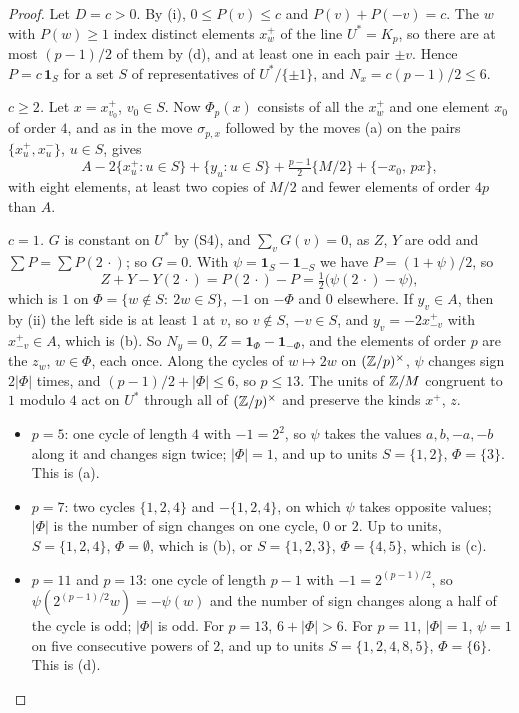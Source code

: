 \begin{proof}
Let $D=c>0$. By (i), $0\le P(v)\le c$ and
$P(v)+P(-v)=c$. The $w$ with $P(w)\ge1$ index distinct elements $x^{+}_{w}$ of
the line $U^{*}=K_{p}$, so there are at most $(p-1)/2$ of them by
(d), and at least one in each pair $\pm v$. Hence
$P=c\,\mathbf 1_{S}$ for a set $S$ of representatives of $U^{*}/\{\pm1\}$, and
$N_{x}=c(p-1)/2\le6$.

\emph{$c\ge2$.} Let $x=x^{+}_{v_{0}}$, $v_{0}\in S$. Now $\Phi_{p}(x)$ consists of
all the $x^{+}_{w}$ and one element $x_{0}$ of order $4$, and as in
 the move $\sigma_{p,x}$ followed by the moves
(a) on the pairs $\{x^{+}_{u},x^{-}_{u}\}$, $u\in S$, gives
\[
  A-2\{x^{+}_{u}:u\in S\}+\{y_{u}:u\in S\}+\tfrac{p-1}{2}\{M/2\}
  +\{-x_{0},\,px\},
\]
with eight elements, at least two copies of $M/2$ and fewer elements of order
$4p$ than $A$.

\emph{$c=1$.} $G$ is constant on $U^{*}$ by (S4), and $\sum_{v}G(v)=0$, as
$Z$, $Y$ are odd and $\sum P=\sum P(2\,\cdot)$; so $G=0$. With
$\psi=\mathbf 1_{S}-\mathbf 1_{-S}$ we have $P=(1+\psi)/2$, so
\[
  Z+Y-Y(2\,\cdot)=P(2\,\cdot)-P=\tfrac12\bigl(\psi(2\,\cdot)-\psi\bigr),
\]
which is $1$ on $\Phi=\{w\notin S:\ 2w\in S\}$, $-1$ on $-\Phi$ and $0$
elsewhere. If $y_{v}\in A$, then by (ii) the left side is
at least $1$ at $v$, so $v\notin S$, $-v\in S$, and $y_{v}=-2x^{+}_{-v}$ with
$x^{+}_{-v}\in A$, which is (b). So $N_{y}=0$,
$Z=\mathbf 1_{\Phi}-\mathbf 1_{-\Phi}$, and the elements of order $p$ are the
$z_{w}$, $w\in\Phi$, each once. Along the cycles of $w\mapsto2w$ on
$(\mathbb{Z}/p)^{\times}$, $\psi$ changes sign $2|\Phi|$ times, and $(p-1)/2+|\Phi|
\le6$, so $p\le13$. The units of $\mathbb{Z}/M$ congruent to $1$ modulo $4$ act on
$U^{*}$ through all of $(\mathbb{Z}/p)^{\times}$ and preserve the kinds $x^{+}$,
$z$.
\begin{itemize}
\item $p=5$: one cycle of length $4$ with $-1=2^{2}$, so $\psi$ takes the
values $a,b,-a,-b$ along it and changes sign twice; $|\Phi|=1$, and up to
units $S=\{1,2\}$, $\Phi=\{3\}$. This is (a).
\item $p=7$: two cycles $\{1,2,4\}$ and $-\{1,2,4\}$, on which $\psi$ takes
opposite values; $|\Phi|$ is the number of sign changes on one cycle, $0$ or
$2$. Up to units, $S=\{1,2,4\}$, $\Phi=\emptyset$, which is (b), or
$S=\{1,2,3\}$, $\Phi=\{4,5\}$, which is (c).
\item $p=11$ and $p=13$: one cycle of length $p-1$ with $-1=2^{(p-1)/2}$, so
$\psi(2^{(p-1)/2}w)=-\psi(w)$ and the number of sign changes along a half of
the cycle is odd; $|\Phi|$ is odd. For $p=13$, $6+|\Phi|>6$. For $p=11$,
$|\Phi|=1$, $\psi=1$ on five consecutive powers of $2$, and up to units
$S=\{1,2,4,8,5\}$, $\Phi=\{6\}$. This is (d).\qedhere
\end{itemize}
\end{proof}

